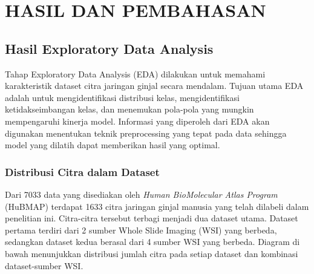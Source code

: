 \chapter{HASIL DAN PEMBAHASAN}

\section{Hasil Exploratory Data Analysis}
\label{sec:hasil-eda}

\noindent Tahap Exploratory Data Analysis (EDA) dilakukan untuk memahami karakteristik dataset citra jaringan ginjal secara mendalam. Tujuan utama EDA adalah untuk mengidentifikasi distribusi kelas, mengidentifikasi ketidakseimbangan kelas, dan menemukan pola-pola yang mungkin mempengaruhi kinerja model. Informasi yang diperoleh dari EDA akan digunakan menentukan teknik preprocessing yang tepat pada data sehingga model yang dilatih dapat memberikan hasil yang optimal.

\subsection{Distribusi Citra dalam Dataset}
\noindent Dari 7033 data yang disediakan oleh \textit{Human BioMolecular Atlas Program }(HuBMAP) terdapat 1633 citra jaringan ginjal manusia yang telah dilabeli dalam penelitian ini. Citra-citra tersebut terbagi menjadi dua dataset utama. Dataset pertama terdiri dari 2 sumber Whole Slide Imaging (WSI) yang berbeda, sedangkan dataset kedua berasal dari 4 sumber WSI yang berbeda. Diagram di bawah menunjukkan distribusi jumlah citra pada setiap dataset dan kombinasi dataset-sumber WSI.

